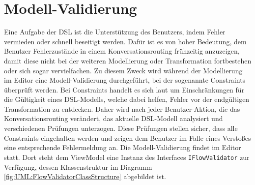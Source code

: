 \section{Modell-Validierung} 
Eine Aufgabe der DSL ist die Unterstützung des Benutzers, indem Fehler vermieden oder schnell beseitigt werden. Dafür ist es von hoher Bedeutung, dem Benutzer Fehlerzustände in einem Konversationsrouting frühzeitig anzuzeigen, damit diese nicht bei der weiteren Modellierung oder Transformation fortbestehen oder sich sogar vervielfachen. Zu diesem Zweck wird während der Modellierung im Editor eine Modell-Validierung durchgeführt, bei der sogenannte Constraints überprüft werden. Bei Constraints handelt es sich laut \cite[S. 82ff, 289ff]{Voelter:13} um Einschränkungen für die Gültigkeit eines DSL-Modells, welche dabei helfen, Fehler vor der endgültigen Transformation zu entdecken. Daher wird nach jeder Benutzer-Aktion, die das Konversationsrouting verändert, das aktuelle DSL-Modell analysiert und verschiedenen Prüfungen unterzogen. Diese Prüfungen stellen sicher, dass alle Constraints eingehalten werden und zeigen dem Benutzer im Falle eines Verstoßes eine entsprechende Fehlermeldung an.
\newline
Die Modell-Validierung findet im Editor statt. Dort steht dem ViewModel eine Instanz des Interfaces \texttt{IFlowValidator} zur Verfügung, dessen Klassenstruktur im Diagramm \ref{fig:UML:FlowValidatorClassStructure} abgebildet ist.


